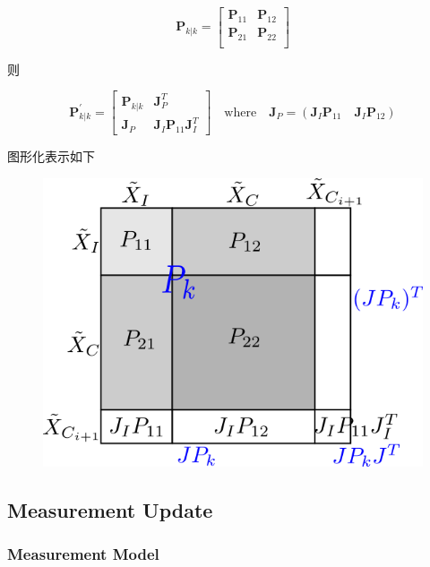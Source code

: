 \documentclass[12pt,a4paper]{article}
\begin{document}
\begin{equation}
\mathbf{P}_{k|k} =
\begin{bmatrix}
\mathbf{P}_{11} & \mathbf{P}_{12} \\
\mathbf{P}_{21} & \mathbf{P}_{22} \\
\end{bmatrix}
\end{equation}

则

\begin{equation}
\mathbf{P}_{k|k}^{\prime} =
\begin{bmatrix}
\mathbf{P}_{k|k} & \mathbf{J}_P^T \\
\mathbf{J}_P & \mathbf{J}_I \mathbf{P}_{11} \mathbf{J}_I^T
\end{bmatrix}
\quad \text{where} \quad
\mathbf{J}_P = \left(\mathbf{J}_I \mathbf{P}_{11} \quad \mathbf{J}_I \mathbf{P}_{12}\right)
\end{equation}

图形化表示如下

\begin{figure}[!htbp]
\centering
\includegraphics[scale=0.6]{images/visual_conv_augmentation.png}
\end{figure}

\subsection{Measurement Update}

\subsubsection{Measurement Model}
\end{document}
